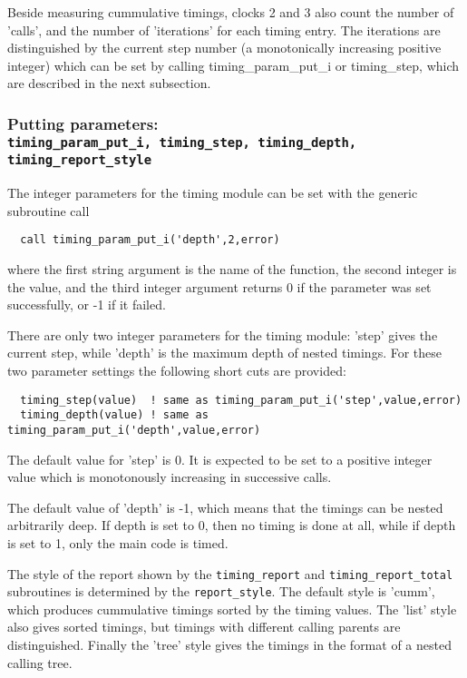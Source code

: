 Beside measuring cummulative timings, clocks 2 and 3 also count the number 
of 'calls', and the number of 'iterations' for each timing entry. 
The iterations are distinguished by the current step number 
(a monotonically increasing positive integer) which can be set by calling
timing\_param\_put\_i or timing\_step, which are
described in the next subsection.

\subsubsection{Putting parameters: \\
{\tt timing\_param\_put\_i, timing\_step, timing\_depth, 
timing\_report\_style}}

The integer parameters for the timing module can be set with the generic
subroutine call
\begin{verbatim}
  call timing_param_put_i('depth',2,error)
\end{verbatim}
where the first string argument is the name of the function,
the second integer is the value, and the third integer argument
returns 0 if the parameter was set successfully, or -1 if it failed.

There are only two integer parameters for the timing module:
'step' gives the current step, while 'depth' is the maximum
depth of nested timings. For these two parameter settings the 
following short cuts are provided:
{\small
\begin{verbatim}
  timing_step(value)  ! same as timing_param_put_i('step',value,error)
  timing_depth(value) ! same as timing_param_put_i('depth',value,error)
\end{verbatim}
}
The default value for 'step' is 0. It is expected to be set to
a positive integer value which is monotonously increasing in
successive calls.

The default value of 'depth' is -1, which 
means that the timings can be nested arbitrarily deep. 
If depth is set to 0, then no timing is done at all, while
if depth is set to 1, only the main code is timed.

The style of the report shown by the 
{\tt timing\_report} and  {\tt timing\_report\_total} subroutines
is determined by the {\tt report\_style}. The default style is
'cumm', which produces cummulative timings sorted by the timing values.
The 'list' style also gives sorted timings, but timings with different calling
parents are distinguished. Finally the 'tree' style gives the timings
in the format of a nested calling tree.

